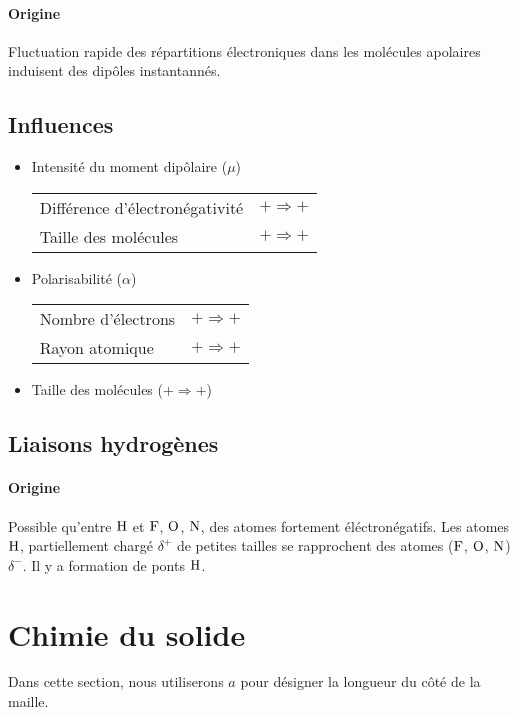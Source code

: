 \documentclass[11pt,a4paper,french]{article}
\begin{document}
\paragraph{Origine}
Fluctuation rapide des répartitions électroniques dans les molécules apolaires induisent des dipôles instantannés.

\subsection{Influences}

\begin{itemize}
	\item Intensité du moment dipôlaire ($\mu$)
		\begin{center}
			\begin{tabular}{ll}
				Différence d'électronégativité & $+ \Rightarrow +$\\
				Taille des molécules & $+ \Rightarrow +$
			\end{tabular}
		\end{center}
	\item Polarisabilité ($\alpha$)
		\begin{center}
			\begin{tabular}{ll}
				Nombre d'électrons  & $+ \Rightarrow +$\\
				Rayon atomique & $+ \Rightarrow +$
			\end{tabular}
		\end{center}
	\item Taille des molécules ($+ \Rightarrow +$) %
\end{itemize}

\subsection{Liaisons hydrogènes}
\paragraph{Origine}
Possible qu'entre $\ce{H}$ et $\ce{F}$, $\ce{O}$, $\ce{N}$, des atomes fortement éléctronégatifs.
Les atomes $\ce{H}$, partiellement chargé $\delta^+$ de petites tailles se rapprochent des atomes ($\ce{F}$, $\ce{O}$, $\ce{N}$) $\delta^-$. Il y a formation de ponts $\ce{H}$.

\section{Chimie du solide}
Dans cette section, nous utiliserons $a$ pour désigner la longueur du côté de la maille.
\end{document}

